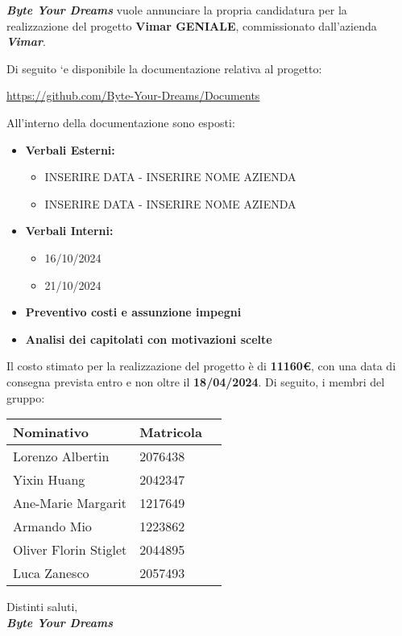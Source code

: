 \documentclass{article}
\begin{document}
\textbf{\textit{Byte Your Dreams}} vuole annunciare la propria candidatura per la realizzazione del progetto
\textbf{Vimar GENIALE}, commissionato dall’azienda \textbf{\textit{Vimar}}.
\bigskip

Di seguito `e disponibile la documentazione relativa al progetto:
\begin{center}
    \url{https://github.com/Byte-Your-Dreams/Documents}
\end{center}

All'interno della documentazione sono esposti:
\begin{itemize}
    \item \textbf{Verbali Esterni:}
        \begin{itemize}
        \item INSERIRE DATA - INSERIRE NOME AZIENDA
        \item INSERIRE DATA - INSERIRE NOME AZIENDA
    \end{itemize}
    \item \textbf{Verbali Interni:}
            \begin{itemize}
                \item 16/10/2024
                \item 21/10/2024
            \end{itemize}
    \item \textbf{Preventivo costi e assunzione impegni}
    \item \textbf{Analisi dei capitolati con motivazioni scelte}
\end{itemize}

Il costo stimato per la realizzazione del progetto è di \textbf{11160\euro}, con una data di consegna prevista entro e non oltre il \textbf{18/04/2024}.
\bigskip
Di seguito, i membri del gruppo:

\begin{center}
\begin{tabular}{|l|l|l|}
\hline
\textbf{Nominativo} & \textbf{Matricola}\\ \hline
Lorenzo Albertin & 2076438\\
Yixin Huang & 2042347\\
Ane-Marie Margarit & 1217649\\
Armando Mio & 1223862\\
Oliver Florin Stiglet & 2044895\\
Luca Zanesco & 2057493\\
\hline
\end{tabular}
\end{center}

\bigskip
\begin{flushright}Distinti saluti, \\
\textit{\textbf{Byte Your Dreams}}\end{flushright}
\end{document}
